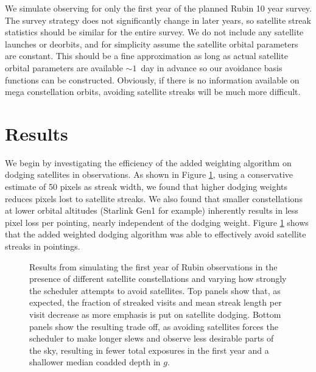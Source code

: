 \documentclass[linenumbers]{aastex631}
\begin{document}
We simulate observing for only the first year of the planned Rubin 10 year survey. The survey strategy does not significantly change in later years, so satellite streak statistics should be similar for the entire survey. We do not include any satellite launches or deorbits, and for simplicity assume the satellite orbital parameters are constant. This should be a fine approximation as long as actual satellite orbital parameters are available $\sim1$\ day in advance so our avoidance basis functions can be constructed. Obviously, if there is no information available on mega constellation orbits, avoiding satellite streaks will be much more difficult.

\section{Results}\label{results}

We begin by investigating the efficiency of the added weighting algorithm on dodging satellites in observations. As shown in Figure \ref{fig-pixel-loss-weight}, using a conservative estimate of 50 pixels as streak width, we found that higher dodging weights reduces pixels lost to satellite streaks. We also found that smaller constellations at lower orbital altitudes (Starlink Gen1 for example) inherently results in less pixel loss per pointing, nearly independent of the dodging weight. Figure \ref{fig-pixel-loss-weight} shows that the added weighted dodging algorithm was able to effectively avoid satellite streaks in pointings.

\begin{figure}[ht!]
\caption{Results from simulating the first year of Rubin observations in the presence of different satellite constellations and varying how strongly the scheduler attempts to avoid satellites. Top panels show that, as expected, the fraction of streaked visits and mean streak length per visit decrease as more emphasis is put on satellite dodging. Bottom panels show the resulting trade off, as avoiding satellites forces the scheduler to make longer slews and observe less desirable parts of the sky, resulting in fewer total exposures in the first year and a shallower median coadded depth in $g$.
\label{fig-pixel-loss-weight}}
\end{figure}
\end{document}
